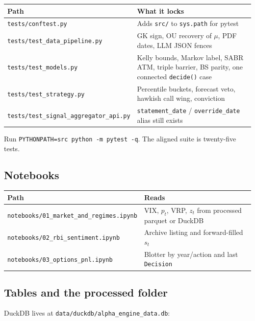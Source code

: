 \documentclass[11pt,a4paper]{article}
\begin{document}
\begin{center}
\begin{tabular}{@{}p{}p{}@{}}
\toprule
Path & What it locks \\
\midrule
\texttt{tests/conftest.py} & Adds \texttt{src/} to \texttt{sys.path} for pytest \\
\texttt{tests/test\_data\_pipeline.py} & GK sign, OU recovery of $\mu$, PDF dates, LLM JSON fences \\
\texttt{tests/test\_models.py} & Kelly bounds, Markov label, SABR ATM, triple barrier, BS parity, one connected \texttt{decide()} case \\
\texttt{tests/test\_strategy.py} & Percentile buckets, forecast veto, hawkish call wing, conviction \\
\texttt{tests/test\_signal\_aggregator\_api.py} & \texttt{statement\_date} / \texttt{override\_date} alias still exists \\
\bottomrule
\end{tabular}
\end{center}

Run \texttt{PYTHONPATH=src python -m pytest -q}. The aligned suite is twenty-five tests.

\subsection{Notebooks}

\begin{center}
\begin{tabular}{@{}p{}p{}@{}}
\toprule
Path & Reads \\
\midrule
\texttt{notebooks/01\_market\_and\_regimes.ipynb} & VIX, $p_t$, VRP, $z_t$ from processed parquet or DuckDB \\
\texttt{notebooks/02\_rbi\_sentiment.ipynb} & Archive listing and forward-filled $s_t$ \\
\texttt{notebooks/03\_options\_pnl.ipynb} & Blotter by year/action and last \texttt{Decision} \\
\bottomrule
\end{tabular}
\end{center}

\subsection{Tables and the processed folder}

DuckDB lives at \texttt{data/duckdb/alpha\_engine\_data.db}:
\end{document}
